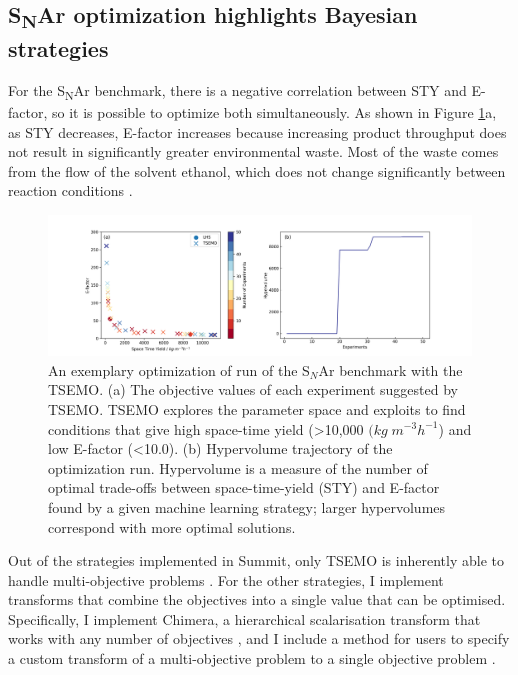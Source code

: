 \subsection{S\textsubscript{N}Ar optimization highlights Bayesian strategies}
For the S\textsubscript{N}Ar benchmark, there is a negative correlation between STY and E-factor, so it is possible to optimize both simultaneously. As shown in Figure \ref{fig:S$_N$Ar_tsemo}a, as STY decreases, E-factor increases because increasing product throughput does not result in significantly greater environmental waste. Most of the waste comes from the flow of the solvent ethanol, which does not change significantly between reaction conditions \cite{Jeraal2020}.

\begin{figure}
    \centering
    \includegraphics[width=\textwidth]{gfx/Chapter02/snar_tsemo_pareto_hv.png}
    \caption{An exemplary optimization of run of the S$_N$Ar benchmark with the TSEMO. (a) The objective values of each experiment suggested by TSEMO. TSEMO explores the parameter space and exploits to find conditions that give high space-time yield (>10,000 $(kg \; m^{-3} h^{-1}$) and low E-factor (<10.0). (b) Hypervolume trajectory of the optimization run. Hypervolume is a measure of the number of optimal trade-offs between space-time-yield (STY) and E-factor found by a given machine learning strategy; larger hypervolumes correspond with more optimal solutions.}
    \label{fig:S$_N$Ar_tsemo}
\end{figure}

Out of the strategies implemented in Summit, only TSEMO is inherently able to handle multi-objective problems \cite{Bradford2018}. For the other strategies, I implement transforms that combine the objectives into a single value that can be optimised. Specifically, I implement Chimera, a hierarchical scalarisation transform that works with any number of objectives \cite{Hase2018b}, and I include a method for users to specify a custom transform of a multi-objective problem to a single objective problem \cite{Fitzpatrick2016, Epps2020}.

